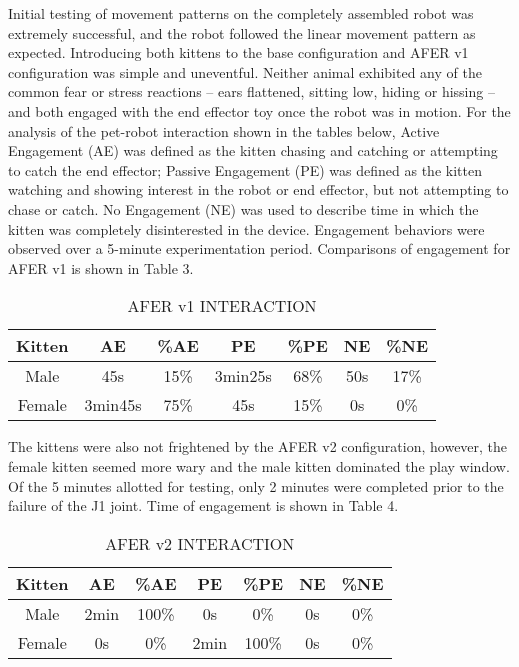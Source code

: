 Initial testing of movement patterns on the completely assembled robot was extremely successful, and the robot followed the linear movement pattern as expected. Introducing both kittens to the base configuration and AFER v1 configuration was simple and uneventful. Neither animal exhibited any of the common fear or stress reactions – ears flattened, sitting low, hiding or hissing – and both engaged with the end effector toy once the robot was in motion. 
For the analysis of the pet-robot interaction shown in the tables below, Active Engagement (AE) was defined as the kitten chasing and catching or attempting to catch the end effector; Passive Engagement (PE) was defined as the kitten watching and showing interest in the robot or end effector, but not attempting to chase or catch. No Engagement (NE) was used to describe time in which the kitten was completely disinterested in the device. Engagement behaviors were observed over a 5-minute experimentation period. Comparisons of engagement for AFER v1 is shown in Table 3.

\begin{center}
\begin{table}[htbp]
\centering
\caption{AFER v1 INTERACTION}
    \begin{tabular}{ |c|c|c|c|c|c|c| }
    \hline
    Kitten & AE & \%AE & PE & \%PE & NE & \%NE \\ \hline
    Male & 45s & 15\% & 3min25s & 68\% & 50s & 17\%  \\ \hline
    Female & 3min45s & 75\% & 45s & 15\% & 0s & 0\% \\ \hline
    \end{tabular}
		\label{table:3}
\end{table}
\end{center}

The kittens were also not frightened by the AFER v2 configuration, however, the female kitten seemed more wary and the male kitten dominated the play window. Of the 5 minutes allotted for testing, only 2 minutes were completed prior to the failure of the J1 joint. Time of engagement is shown in Table 4.

\begin{center}
\begin{table}[h]
\centering
\caption{AFER v2 INTERACTION}
    \begin{tabular}{ |c|c|c|c|c|c|c| }
    \hline
    Kitten & AE & \%AE & PE & \%PE & NE & \%NE \\ \hline
    Male & 2min & 100\% & 0s & 0\% & 0s & 0\%  \\ \hline
    Female & 0s & 0\% & 2min & 100\% & 0s & 0\% \\ \hline
    \end{tabular}
		\label{table:4}
\end{table}
\end{center}

